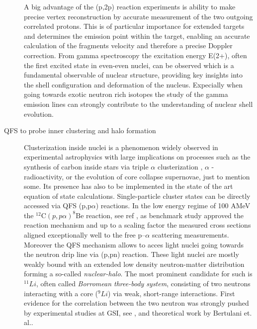\begin{description}
A big advantage of the (p,2p) reaction experiments is ability to make precise vertex reconstruction by accurate measurement of the two outgoing correlated protons. This is of particular importance for extended targets and determines the emission point within the target, enabling an accurate calculation of the fragment\textquotesingle s velocity and therefore a precise Doppler correction.\newline
From gamma spectroscopy the excitation energy E(2+), often the first excited state in even-even nuclei, can be observed which is a fundamental observable of nuclear structure, providing key insights into the shell configuration and deformation of the nucleus\cite{panin2021quasi}. Expecially when going towards exotic neutron rich isotopes the study of the gamma emission lines can strongly contribute to the understanding of nuclear shell evolution.
\item[QFS to probe inner clustering and halo formation]Clusterization inside nuclei is a phenomenon widely observed in experimental astrophysics with large implications on processes such as the synthesis of carbon  inside stars via triple $\alpha$ clusterization \cite{hjorth2011carbon}, $\alpha$ - radioactivity, or the evolution of core collapse supernovae\cite{sumiyoshi2008appearance}, just to mention some. Its presence has also to be implemented in the state of the art equation of state calculations.\newline
Single-particle cluster states can be directly accessed via QFS (p,p$\alpha$) reactions. In the low energy regime of 100 AMeV the $^{12}\text{C}(p, p\alpha)^{8}\text{Be}$ reaction, see ref \cite{mabiala2009analyzing}, as benchmark study approved the reaction mechanism and up to a scaling factor the measured cross sections aligned exceptionally well to the free p–$\alpha$ scattering measurements.\newline
Moreover the QFS mechanism allows to acces light nuclei going towards the neutron drip line via (p,pn) reaction. These light nuclei are mostly weakly bound with an extended low density neutron-matter distribution forming a so-called \textit{nuclear-halo}.\newline
The most prominent candidate for such is $^{11}Li$, often called \textit{Borromean three-body system}\cite{johannsen199011li}, consisting of two neutrons interacting with a core ($^9Li$) via weak, short-range interactions. First evidence for the correlation  between the two neutron was strongly pushed by experimental studies at GSI, see \cite{simon1999direct}, and theoretical work by Bertulani et. al.\cite{bertulani2007geometry}.\newline

\end{description}
